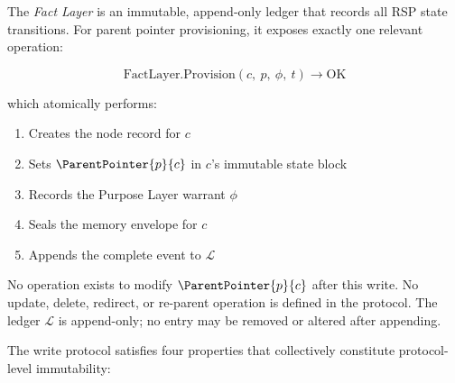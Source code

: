 \begin{dfn}
\label{dfn:fact-layer-write}
The \emph{Fact Layer} is an immutable, append-only ledger that records all RSP state transitions. For parent pointer provisioning, it exposes exactly one relevant operation:

\begin{equation}
\text{FactLayer.Provision}(c,\ p,\ \phi,\ t) \rightarrow \text{OK}
\label{eq:provision-op}
\end{equation}

which atomically performs:
\begin{enumerate}
    \item Creates the node record for $c$
    \item Sets $\ParentPointer{p}{c}$ in $c$'s immutable state block
    \item Records the Purpose Layer warrant $\phi$
    \item Seals the memory envelope for $c$
    \item Appends the complete event to $\mathcal{L}$
\end{enumerate}

No operation exists to modify $\ParentPointer{p}{c}$ after this write. No update, delete, redirect, or re-parent operation is defined in the protocol. The ledger $\mathcal{L}$ is append-only; no entry may be removed or altered after appending.
\end{dfn}

The write protocol satisfies four properties that collectively constitute protocol-level immutability:

